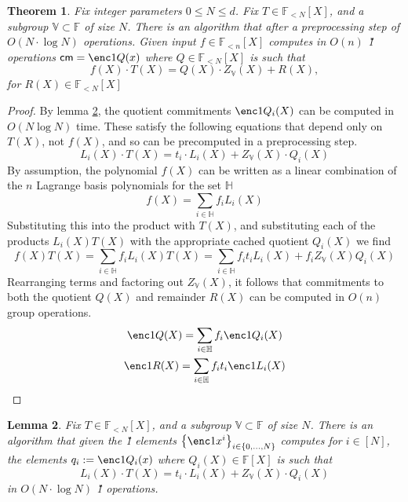 \documentclass[11pt]{article} %
\newcommand{\F}{\ensuremath{\mathbb F}\xspace}
\newcommand{\cm}{\ensuremath{\mathsf{cm}}\xspace}
\newcommand{\defeq}{:=}
\newcommand{\sett}[2]{\ensuremath{\set{#1}_{#2}}\xspace}
\newcommand{\set}[1]{\ensuremath{\left\{#1\right\}}\xspace}
\newcommand{\polysofdeg}[1]{\ensuremath{\F_{< #1}[X]}\xspace}
\newtheorem{lemma}{Lemma}[section]
\newtheorem{thm}[lemma]{Theorem}
\newcommand{\subspace}{\ensuremath{\mathbb{H}}\xspace}
\newcommand{\bigspace}{\ensuremath{\mathbb{V}}\xspace}
\newcommand{\witsize}{\ensuremath{n}\xspace}
\newcommand{\tabsize}{\ensuremath{N}\xspace}
\newcommand{\tabruntime}{\ensuremath{\tabsize\log\tabsize}\xspace}
\begin{document}
\begin{thm}
Fix integer parameters $0\leq N\leq d$. Fix $T\in \polysofdeg{\tabsize}$, and a subgroup $\bigspace\subset \F$ of size \tabsize. 
There is an algorithm that after a preprocessing step of $O(\tabsize\cdot \log \tabsize)$ operations.
Given input $f\in \polysofdeg{\witsize}$ computes in %
$O(\witsize)$ \G1 operations
$\cm=\enc1{Q(x)}$ where $Q\in \polysofdeg{\tabsize}$ is such that
\[f(X)\cdot T(X) = Q(X)\cdot Z_{\bigspace}(X) + R(X),\]
for $R(X)\in \polysofdeg{\tabsize}$
\end{thm}
\begin{proof}
    By lemma \ref{lem:cq-compute}, the quotient commitments $\enc1{Q_i(X)}$ can be
    computed in $O(\tabruntime)$ time. These satisfy the following equations
    that depend only on $T(X)$, not $f(X)$, and so can be precomputed in a preprocessing
    step.
    \[L_i(X)\cdot T(X)=t_i\cdot L_i(X) + Z_\bigspace(X)\cdot Q_i(X)\]
    By assumption, the polynomial $f(X)$ can be written as a linear combination of
    the $\witsize$ Lagrange basis polynomials for the set $\subspace$
    \[ f(X) = \sum_{i \in \subspace} f_i L_i(X) \]
    Substituting this into the product with $T(X)$, and substituting each of the products
    $L_i(X) T(X)$ with the appropriate cached quotient $Q_i(X)$ we find
    \[ f(X) T(X) = \sum_{i \in \subspace} f_i L_i(X) T(X) =\sum_{i \in
    \subspace} f_i t_i L_i(X) + f_i Z_\bigspace(X) Q_i(X) \] 
    Rearranging terms and factoring out $Z_\bigspace(X)$, it follows that
    commitments to both the quotient $Q(X)$ and remainder $R(X)$ can be computed in
    $O(n)$ group operations.
    \begin{gather*}
        \enc1{Q(X)} = \sum_{i \in \subspace} f_i \enc1{Q_i(X)} \\
        \enc1{R(X)} = \sum_{i \in \subspace} f_i t_i \enc1{L_i(X)}
    \end{gather*}
\end{proof}

\begin{lemma}
\label{lem:cq-compute}
Fix $T\in \polysofdeg{\tabsize}$, and a subgroup $\bigspace\subset \F$ of size \tabsize. 
There is an algorithm that given the \G1 elements $\sett{\enc1{x^i}}{i\in \set{0,\ldots,\tabsize}}$ computes for $i\in [\tabsize]$, the elements 
$q_i\defeq \enc1{Q_i(x)}$
where $Q_i(X)\in \F[X]$ is such that
\[L_i(X)\cdot T(X)=t_i\cdot L_i(X) + Z_\bigspace(X)\cdot Q_i(X)\]
in $O(\tabsize\cdot \log \tabsize)$ \G1 operations.
 
\end{lemma}
\end{document}

